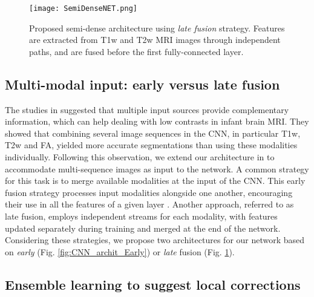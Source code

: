 \documentclass[twoside,espcrc2]{elsarticle}
\begin{document}
\begin{figure}[ht!]
\centering
\begin{center} 
        \texttt{[image: SemiDenseNET.png]}
\caption{Proposed semi-dense architecture using \textit{late fusion} strategy. Features are extracted from T1w and T2w MRI images through independent paths, and are fused before the first fully-connected layer.}
\label{fig:CNN_archit_Late}
\end{center}        
\end{figure}

\subsection{Multi-modal input: early versus late fusion}
\label{ssec:multi-source}

The studies in \cite{zhang2015deep,nie2016fully} suggested that multiple input sources provide complementary information, which can help dealing with low contrasts in infant brain MRI. They showed that combining several image sequences in the CNN, in particular T1w, T2w and FA, yielded more accurate segmentations than using these modalities individually. Following this observation, we extend our architecture in \cite{DolzNeuro2017} to accommodate multi-sequence images as input to the network. A common strategy for this task is to merge available modalities at the input of the CNN. This early fusion strategy processes input modalities alongside one another, encouraging their use in all the features of a given layer  \cite{zhang2015deep}. Another approach, referred to as late fusion, employs independent streams for each modality, with features updated separately during training and merged at the end of the network. Considering these strategies, we propose two architectures for our network based on \textit{early} (Fig. \ref{fig:CNN_archit_Early}) or \textit{late} fusion (Fig. \ref{fig:CNN_archit_Late}). 















\subsection{Ensemble learning to suggest local corrections}
\end{document}
